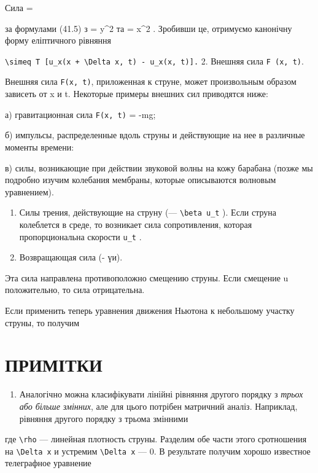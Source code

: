 \documentclass[
  ukrainian,
]{article}
\providecommand{\tightlist}{%
  \setlength{\itemsep}{0pt}\setlength{\parskip}{0pt}}
\begin{document}
Сила =

за формулами (41.5) з \xi = y\^{}2 та \eta = x\^{}2 . Зробивши це,
отримуємо канонічну форму еліптичного рівняння

\texttt{\textbackslash{}simeq\ T\ {[}u\_x(x\ +\ \textbackslash{}Delta\ x,\ t)\ -\ u\_x(x,\ t){]}.}
2. Внешняя сила \texttt{F\ (x,\ t)}.

Внешняя сила \texttt{F(x,\ t)}, приложенная к струне, может произвольным
образом зависеть от x и t. Некоторые примеры внешних сил приводятся
ниже:

а) гравитационная сила \texttt{F(x,\ t)} = -mg;

б) импульсы, распределенные вдоль струны и действующие на нее в
различные моменты времени:

в) силы, возникающие при действии звуковой волны на кожу барабана (позже
мы подробно изучим колебания мембраны, которые описываются волновым
уравнением).

\begin{enumerate}
\def\labelenumi{\arabic{enumi}.}
\setcounter{enumi}{2}
\item
  Силы трения, действующие на струну (---
  \texttt{\textbackslash{}beta\ u\_t} ). Если струна колеблется в среде,
  то возникает сила сопротивления, которая пропорциональна скорости
  \texttt{u\_t} .
\item
  Возвращающая сила (- үи).
\end{enumerate}

Эта сила направлена противоположно смещению струны. Если смещение u
положительно, то сила отрицательна.

Если применить теперь уравнения движения Ньютона к небольшому участку
струны, то получим

\section{ПРИМІТКИ}\label{ux43fux440ux438ux43cux456ux442ux43aux438-2}

\begin{enumerate}
\def\labelenumi{\arabic{enumi}.}
\tightlist
\item
  Аналогічно можна класифікувати лінійні рівняння другого порядку з
  \emph{трьох або більше змінних}, але для цього потрібен матричний
  аналіз. Наприклад, рівняння другого порядку з трьома змінними
\end{enumerate}

где \texttt{\textbackslash{}rho} --- линейная плотность струны. Разделим
обе части этого сротношения на \texttt{\textbackslash{}Delta\ x} и
устремим \texttt{\textbackslash{}Delta\ x} --- 0. В результате получим
хорошо известное телеграфное уравнение
\end{document}
